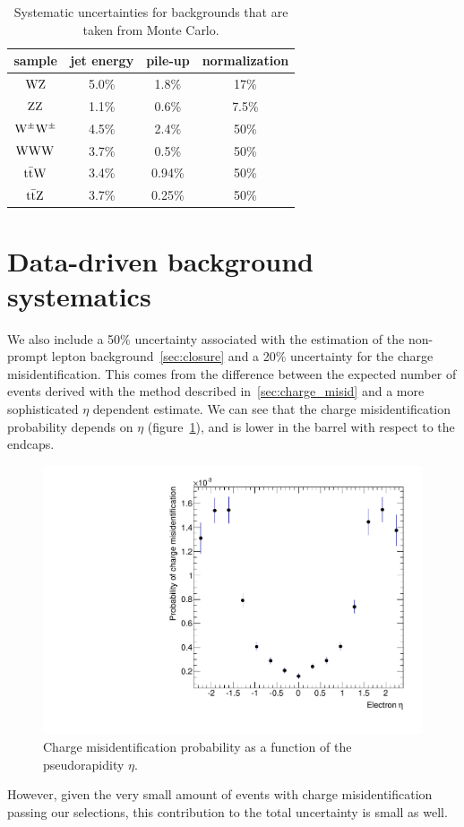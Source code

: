 \begin{table}[htb]
    \centering
\begin{tabular}{*4c}
    \toprule
    sample       &    jet energy & pile-up & normalization \\
    \midrule
$\mathrm{W}\mathrm{Z}$             & 5.0\%  & 1.8\%  & 17\%    \\
$\mathrm{Z}\mathrm{Z}$             & 1.1\%  & 0.6\%  & 7.5\% \\
$\mathrm{W}^{\pm}\mathrm{W}^{\pm}$ & 4.5\%  & 2.4\%  & 50\% \\
$\mathrm{W}\mathrm{W}\mathrm{W}$            & 3.7\%  & 0.5\%  & 50\% \\
$\mathrm{t}\bar{\mathrm{t}} \mathrm{W}$       & 3.4\%  & 0.94\% & 50\% \\
$\mathrm{t}\bar{\mathrm{t}} \mathrm{Z}$       & 3.7\%  & 0.25\% & 50\% \\
\bottomrule
\end{tabular}
\caption{Systematic uncertainties for backgrounds that are taken from Monte Carlo.}
\label{tab:MConlySystematics}
\end{table}

\section{Data-driven background systematics}
We also include a 50\% uncertainty associated with the
estimation of the non-prompt lepton background~\ref{sec:closure}
and a 20\% uncertainty for the charge misidentification. This comes from the
difference between the expected number of events derived with the method
described in~\ref{sec:charge_misid} and a more sophisticated $\eta$
dependent estimate. We can see that the charge misidentification probability
depends on $\eta$ (figure~\ref{fig:charge_misid_eta}), and is lower in the
barrel with respect to the endcaps.
\begin{figure}[htb]
    \centering
    \includegraphics[width=.7\textwidth]{images/pdf/h_MisIDProbvsEta}
    \caption{Charge misidentification probability as a function of the
    pseudorapidity $\eta$.}
    \label{fig:charge_misid_eta}
\end{figure}
However, given the very small amount of events with charge misidentification
passing our selections, this contribution to the total uncertainty is small
as well.


